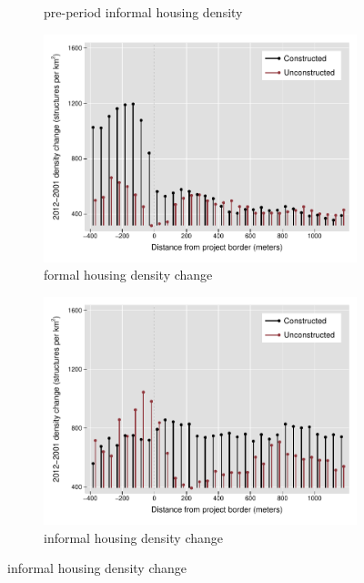 \documentclass[12pt]{article}
\begin{document}
\begin{figure}[t!]
\begin{subfigure}[b]{0.495\textwidth}
            \caption[]%
            {{\small pre-period informal housing density}}    
            \label{fig:preinf}
        \end{subfigure}
        \vskip 1mm \vskip 0pt
        \begin{subfigure}[b]{0.495\textwidth}   
            \centering 
            \includegraphics[width=\textwidth,trim={0.3cm .3cm 0.1cm 0cm}, clip=true]{figures/bblu_for_rawchanges}
            \caption[]%
            {{\small formal housing density change}}    
            \label{fig:forchange}
        \end{subfigure}
        \hfill
        \begin{subfigure}[b]{0.495\textwidth}   
            \centering 
            \includegraphics[width=\textwidth,trim={0.3cm .3cm 0.1cm 0cm}, clip=true]{figures/bblu_inf_rawchanges}
            \caption[]%
            {{\small informal housing density change}}    
            \label{fig:infchange}
        \end{subfigure}
        \label{fig:rawbblumeans}
        \vspace{-6mm}
    \end{figure} 
\end{document}

